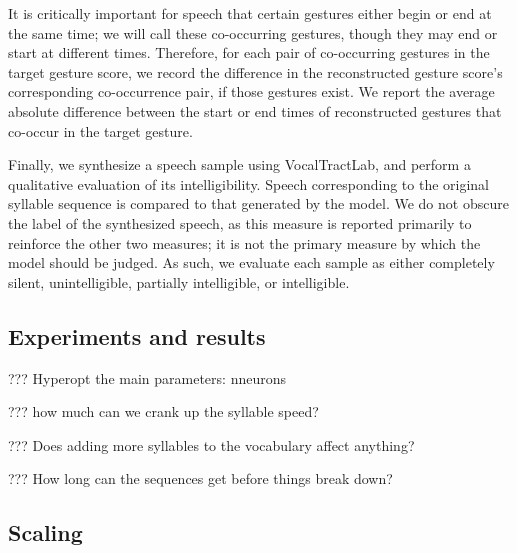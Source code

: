 It is critically important
for speech that certain gestures
either begin or end at the same time;
we will call these co-occurring gestures,
though they may end or start at different times.
Therefore, for each pair
of co-occurring gestures in the
target gesture score,
we record the difference
in the reconstructed gesture score's
corresponding co-occurrence pair,
if those gestures exist.
We report the average absolute
difference between the start or end times
of reconstructed gestures
that co-occur in the target gesture.

Finally, we synthesize a speech sample
using VocalTractLab,
and perform a qualitative evaluation
of its intelligibility.
Speech corresponding to the
original syllable sequence is compared
to that generated by the model.
We do not obscure the label
of the synthesized speech,
as this measure is reported primarily
to reinforce the other two measures;
it is not the primary measure
by which the model should be judged.
As such, we evaluate each sample
as either completely silent,
unintelligible, partially intelligible,
or intelligible.

\subsection{Experiments and results}

??? Hyperopt the main parameters: nneurons

??? how much can we crank up the syllable speed?

??? Does adding more syllables to the vocabulary affect anything?

??? How long can the sequences get before things break down?

\subsection{Scaling}






